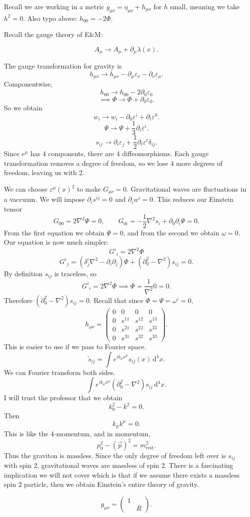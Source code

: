 
Recall we are working in a metric $g_{\mu \nu } =\eta _{\mu \nu } +h_{\mu \nu } $ for $h$ small, meaning we take $h^2=0$. Also typo above: $h_{00} =-2\Phi $.

Recall the gauge theory of E\&M:
\begin{mdframed}
	\[
		A_\mu \to A_\mu +\partial _\mu \lambda (x)
	.\]
\end{mdframed}
The gauge transformation for gravity is
\[
	h_{\mu \nu } \to h_{\mu \nu } -\partial _\mu \varepsilon _\nu -\partial _\nu \varepsilon _\mu 
.\]
Componentwise,
\[
	h_{00} \to h_{00} -2 \partial _0\varepsilon _0
\]
\[
	\implies \Phi \to \Phi +\partial _0\varepsilon _0
.\]
So we obtain
\[
	w_i \to w_i-\partial _0\varepsilon^i+\partial _i\varepsilon ^0
.\]
\[
	\Psi \to \Psi +\frac{1}{3} \partial _i \varepsilon ^i
.\]
\[
	s_{ij} \to \partial _i\varepsilon _j+\frac{1}{2} \partial _t\varepsilon ^t\delta _{ij} 
.\]
Since $e^\mu $ has 4 components, there are 4 diffeomorphisms. Each gauge transformation removes a degree of freedom, so we lose 4 more degrees of freedom, leaving us with 2. 

We can choose $\varepsilon ^\mu (x)^2 $ to make $G_{\mu \nu } =0$. Gravitational waves are fluctuations in a vaccuum. We will impose $\partial _is^{ij} =0$ and $\partial _iw^i=0$. This reduces our Einstein tensor
\[
	G_{00} =2\nabla ^2 \Psi =0,\qquad G_{0i} =-\frac{1}{2} \nabla ^2 s_{i} +   \partial _0 \partial _i \Psi =0
.\]
From the first equation we obtain $\Psi =0$, and from the second we obtain $\omega =0$. Our equation is now much simpler:
\[
	G^i\!_i=2\nabla ^2\Phi 
\]
\[
	G^i\!_j=(\delta ^i_j\nabla ^2-\partial _i \partial _j)\Phi +(\partial _0^2-\nabla ^2)s_{ij} =0
.\]
By definition $s_{ij} $ is traceless, so
\[
	G^i\!_i = 2\nabla ^2\Phi  \implies \Phi =\frac{1}{\nabla ^2} 0 = 0
.\]
Therefore $\left( \partial _0^2 - \nabla ^2 \right) s_{ij} =0$. Recall that since $\Phi =\Psi =\omega ^i=0$,
\[
	h_{\mu \nu } =\begin{pmatrix}
	0 & 0 & 0 & 0 \\
	0 & s^{11}  & s^{12}  & s^{13}  \\
	0 & s^{21}  & s^{22}  & s^{23}  \\
	0 & s^{31}  & s^{32}  & s^{33} 
	\end{pmatrix}
.\]
This is easier to use if we pass to Fourier space.
\[
	\widetilde{s} _{ij} =\int e^{ik_\mu x^\mu } s_{ij} (x)\,\mathrm{d} ^4x
.\]
We can Fourier transform both sides.
\[
	\int e^{ik_\mu x^\mu } \left( \partial _0^2 - \nabla ^2 \right) s_{ij}  \,\mathrm{d} ^4x
.\]
I will trust the professor that we obtain
\[
	k_0^2-k^2=0
.\]
Then
\[
	k_\mu k^\mu =0
.\]
This is like the 4-momentum, and in momentum,
\[
	p_0^2 - (\vec{p}) ^2=m^2_{\text{rest} } 
.\]
Thus the graviton is massless. Since the only degree of freedom left over is $s_{ij} $ with spin 2, gravitational waves are massless of spin 2. There is a fascinating implication we will not cover which is that if we assume there exists a massless spin 2 particle, then we obtain Einstein's entire theory of gravity.





\[
	g_{\mu \nu } =\begin{pmatrix}
	1 &  \\
	 & R
	\end{pmatrix}
.\]

